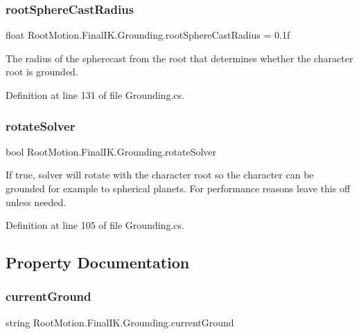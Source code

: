 \subsubsection{\texorpdfstring{root\+Sphere\+Cast\+Radius}{rootSphereCastRadius}}
{\footnotesize\ttfamily float Root\+Motion.\+Final\+I\+K.\+Grounding.\+root\+Sphere\+Cast\+Radius = 0.\+1f}



The radius of the spherecast from the root that determines whether the character root is grounded. 



Definition at line 131 of file Grounding.\+cs.

\mbox{\label{class_root_motion_1_1_final_i_k_1_1_grounding_a54acf8006a5d13da07def413ce38c3dc}} 
\subsubsection{\texorpdfstring{rotate\+Solver}{rotateSolver}}
{\footnotesize\ttfamily bool Root\+Motion.\+Final\+I\+K.\+Grounding.\+rotate\+Solver}



If true, solver will rotate with the character root so the character can be grounded for example to spherical planets. For performance reasons leave this off unless needed. 



Definition at line 105 of file Grounding.\+cs.



\subsection{Property Documentation}
\mbox{\label{class_root_motion_1_1_final_i_k_1_1_grounding_a562a705694c04cf683d852ce2cceb933}} 
\subsubsection{\texorpdfstring{current\+Ground}{currentGround}}
{\footnotesize\ttfamily string Root\+Motion.\+Final\+I\+K.\+Grounding.\+current\+Ground\hspace{0.3cm}{\ttfamily [get]}}



